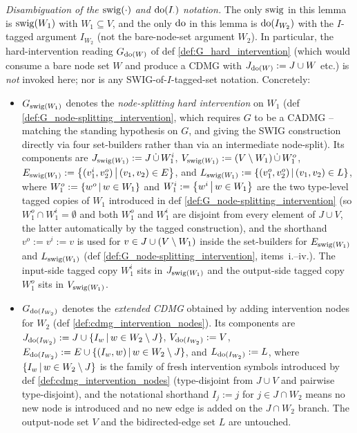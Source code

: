 \documentclass[main]{subfiles}
\begin{document}
\begin{Lem}
    \emph{Disambiguation of the $\mathrm{swig}(\cdot)$ and $\operatorname{do}(I_{\cdot})$ notation.}
    The only $\mathrm{swig}$ in this lemma is $\mathrm{swig}(W_1)$ with $W_1 \subseteq V$, and the only $\operatorname{do}$ in this lemma is $\operatorname{do}(I_{W_2})$ with the $I$-tagged argument $I_{W_2}$ (not the bare-node-set argument $W_2$). In particular, the hard-intervention reading $G_{\operatorname{do}(W)}$ of def \ref{def:G_hard_intervention} (which would consume a bare node set $W$ and produce a CDMG with $J_{\operatorname{do}(W)} := J \cup W$ etc.) is \emph{not} invoked here; nor is any SWIG-of-$I$-tagged-set notation. Concretely:
    \begin{itemize}
        \item $G_{\mathrm{swig}(W_1)}$ denotes the \emph{node-splitting hard intervention} on $W_1$ (def \ref{def:G_node-splitting_intervention}, which requires $G$ to be a CADMG -- matching the standing hypothesis on $G$, and giving the SWIG construction directly via four set-builders rather than via an intermediate node-split). Its components are
              $J_{\mathrm{swig}(W_1)} := J \,\dot{\cup}\, W_1^i$,
              $V_{\mathrm{swig}(W_1)} := (V \setminus W_1) \,\dot{\cup}\, W_1^o$,
              $E_{\mathrm{swig}(W_1)} := \left \{ (v_1^i, v_2^o) \,\middle|\, (v_1, v_2) \in E \right \}$, and
              $L_{\mathrm{swig}(W_1)} := \left \{ (v_1^o, v_2^o) \,\middle|\, (v_1, v_2) \in L \right \}$,
              where $W_1^o := \left \{ w^o \,\middle|\, w \in W_1 \right \}$ and $W_1^i := \left \{ w^i \,\middle|\, w \in W_1 \right \}$ are the two type-level tagged copies of $W_1$ introduced in def \ref{def:G_node-splitting_intervention} (so $W_1^o \cap W_1^i = \emptyset$ and both $W_1^o$ and $W_1^i$ are disjoint from every element of $J \cup V$, the latter automatically by the tagged construction), and the shorthand $v^o := v^i := v$ is used for $v \in J \cup (V \setminus W_1)$ inside the set-builders for $E_{\mathrm{swig}(W_1)}$ and $L_{\mathrm{swig}(W_1)}$ (def \ref{def:G_node-splitting_intervention}, items~i.--iv.). The input-side tagged copy $W_1^i$ sits in $J_{\mathrm{swig}(W_1)}$ and the output-side tagged copy $W_1^o$ sits in $V_{\mathrm{swig}(W_1)}$.
        \item $G_{\operatorname{do}(I_{W_2})}$ denotes the \emph{extended CDMG} obtained by adding intervention nodes for $W_2$ (def \ref{def:cdmg_intervention_nodes}). Its components are
              $J_{\operatorname{do}(I_{W_2})} := J \cup \left \{ I_w \,\middle|\, w \in W_2 \setminus J \right \}$,
              $V_{\operatorname{do}(I_{W_2})} := V$,
              $E_{\operatorname{do}(I_{W_2})} := E \cup \left \{ (I_w, w) \,\middle|\, w \in W_2 \setminus J \right \}$, and
              $L_{\operatorname{do}(I_{W_2})} := L$,
              where $\left \{ I_w \,\middle|\, w \in W_2 \setminus J \right \}$ is the family of fresh intervention symbols introduced by def \ref{def:cdmg_intervention_nodes} (type-disjoint from $J \cup V$ and pairwise type-disjoint), and the notational shorthand $I_j := j$ for $j \in J \cap W_2$ means no new node is introduced and no new edge is added on the $J \cap W_2$ branch. The output-node set $V$ and the bidirected-edge set $L$ are untouched.
    \end{itemize}


\end{Lem}
\end{document}
